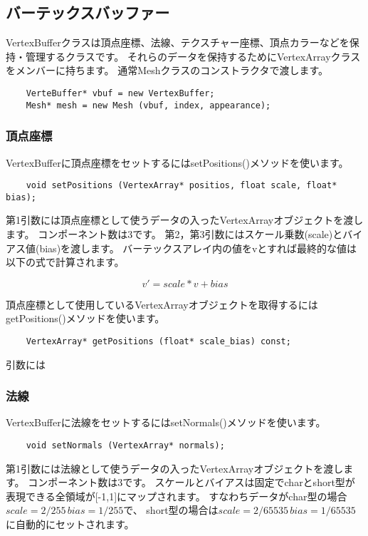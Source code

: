 \subsection {バーテックスバッファー}

VertexBufferクラスは頂点座標、法線、テクスチャー座標、頂点カラーなどを保持・管理するクラスです。
それらのデータを保持するためにVertexArrayクラスをメンバーに持ちます。
通常Meshクラスのコンストラクタで渡します。

\begin{verbatim}
    VerteBuffer* vbuf = new VertexBuffer;
    Mesh* mesh = new Mesh (vbuf, index, appearance);
\end{verbatim}


\subsubsection{頂点座標}

VertexBufferに頂点座標をセットするにはsetPositions()メソッドを使います。

\begin{verbatim}
    void setPositions (VertexArray* positios, float scale, float* bias);
\end{verbatim}

第1引数には頂点座標として使うデータの入ったVertexArrayオブジェクトを渡します。
コンポーネント数は3です。
第2，第3引数にはスケール乗数(scale)とバイアス値(bias)を渡します。
バーテックスアレイ内の値をvとすれば最終的な値は以下の式で計算されます。

\[ v' = scale * v + bias \]


頂点座標として使用しているVertexArrayオブジェクトを取得するにはgetPositions()メソッドを使います。

\begin{verbatim}
    VertexArray* getPositions (float* scale_bias) const;
\end{verbatim}

引数には

\subsubsection{法線}

VertexBufferに法線をセットするにはsetNormals()メソッドを使います。

\begin{verbatim}
    void setNormals (VertexArray* normals);
\end{verbatim}

第1引数には法線として使うデータの入ったVertexArrayオブジェクトを渡します。
コンポーネント数は3です。
スケールとバイアスは固定でcharとshort型が表現できる全領域が[-1,1]にマップされます。
すなわちデータがchar型の場合$ scale=2/255 \, bias=1/255 $で、
short型の場合は$ scale=2/65535 \, bias=1/65535 $に自動的にセットされます。

